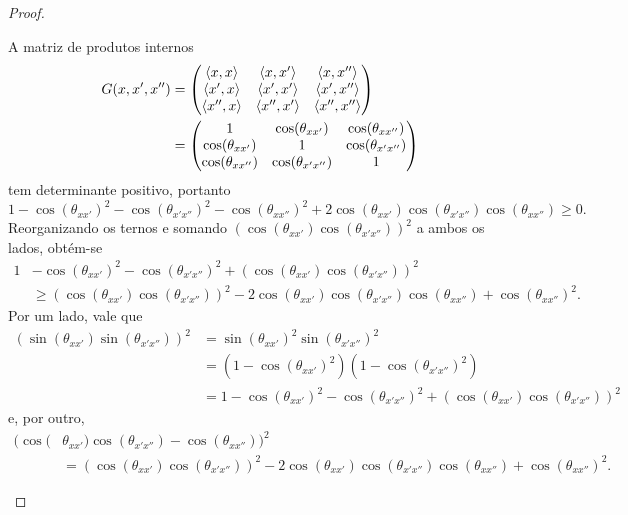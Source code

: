 \begin{proof}
\begin{enumerate}
	A matriz de produtos internos
		\begin{align*}
			G(x,x',x'') &=
			\begin{pmatrix}
			\left\langle{x},{x}\right\rangle		& \left\langle{x},{x'}\right\rangle		& \left\langle{x},{x''}\right\rangle \\
			\left\langle{x'},{x}\right\rangle	& \left\langle{x'},{x'}\right\rangle		& \left\langle{x'},{x''}\right\rangle \\
			\left\langle{x''},{x}\right\rangle	& \left\langle{x''},{x'}\right\rangle	& \left\langle{x''},{x''}\right\rangle \\
			\end{pmatrix} \\
			&=
			\begin{pmatrix}
			1 & \cos(\theta_{xx'}) & \cos(\theta_{xx''}) \\
			\cos(\theta_{xx'}) & 1 & \cos(\theta_{x'x''}) \\
			\cos(\theta_{xx''}) & \cos(\theta_{x'x''}) & 1 \\
			\end{pmatrix}
		\end{align*}
	tem determinante positivo, portanto
		\begin{equation*}
		1 - \cos(\theta_{xx'})^2 - \cos(\theta_{x'x''})^2 - \cos(\theta_{xx''})^2 + 2\cos(\theta_{xx'})\cos(\theta_{x'x''})\cos(\theta_{xx''}) \geq 0.
		\end{equation*}
	Reorganizando os ternos e somando $(\cos(\theta_{xx'})\cos(\theta_{x'x''}))^2$ a ambos os lados, obtém-se
		\begin{align*}
		1& - \cos(\theta_{xx'})^2 - \cos(\theta_{x'x''})^2 + (\cos(\theta_{xx'})\cos(\theta_{x'x''}))^2  \\
			&\geq (\cos(\theta_{xx'})\cos(\theta_{x'x''}))^2 - 2\cos(\theta_{xx'})\cos(\theta_{x'x''})\cos(\theta_{xx''}) + \cos(\theta_{xx''})^2.
		\end{align*}
	Por um lado, vale que
		\begin{align*}
		(\sin(\theta_{xx'}) \sin(\theta_{x'x''}))^2 &= \sin(\theta_{xx'})^2 \sin(\theta_{x'x''})^2 \\
			&= (1 - \cos(\theta_{xx'})^2) (1 - \cos(\theta_{x'x''})^2) \\
			&= 1 - \cos(\theta_{xx'})^2 - \cos(\theta_{x'x''})^2 + (\cos(\theta_{xx'})\cos(\theta_{x'x''}))^2
		\end{align*}
	e, por outro,
		\begin{align*}
		(\cos(&\theta_{xx'})\cos(\theta_{x'x''}) - \cos(\theta_{xx''}))^2 \\
			&= (\cos(\theta_{xx'})\cos(\theta_{x'x''}))^2 - 2\cos(\theta_{xx'})\cos(\theta_{x'x''})\cos(\theta_{xx''}) + \cos(\theta_{xx''})^2.
		\end{align*}

\end{enumerate}
\end{proof}
